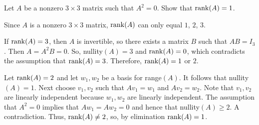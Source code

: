 \documentclass{ximera}
\begin{document}
\begin{exercise} \label{c5.8.4}
Let $A$ be a nonzero $3\times 3$ matrix such that $A^2=0$.  Show that
${\rm rank}(A)=1$.

\begin{solution}

\soln Since $A$ is a nonzero $3 \times 3$ matrix, ${\rm rank}(A)$ can only equal $1$,
$2$, $3$.  

If ${\rm rank}(A) = 3$, then $A$ is invertible, so there exists a matrix $B$ such that 
$AB = I_3$.  Then $A = A^2B = 0$.  So, nullity$(A) = 3$ and ${\rm rank}(A) = 0$, 
which contradicts the assumption that ${\rm rank}(A) = 3$.  Therefore, ${\rm rank}(A) =1$ or  $2$.

Let ${\rm rank}(A) = 2$ and let $w_1, w_2$ be a basis for range$(A)$.  It follows that 
nullity$(A) =1$.  Next choose $v_1,v_2$ such that $Av_1 = w_1$ and $Av_2 = w_2$. 
Note that $v_1,v_2$ are linearly independent because $w_1,w_2$ are linearly 
independent.  The assumption that $A^2=0$ implies that $Aw_1 = Aw_2 = 0$ and 
hence that nullity$(A) \geq 2$.  A contradiction.  Thus, ${\rm rank}(A) \neq 2$, so, by 
elimination ${\rm rank}(A) = 1$.

\end{solution}
\end{exercise}
\end{document}
